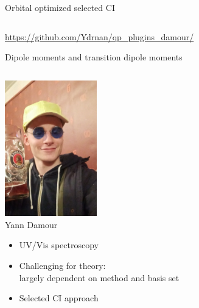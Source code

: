 \documentclass[aspectratio=169,9pt]{beamer}
\begin{document}
\begin{frame}{Orbital optimized selected CI}
\begin{columns}
        \end{columns}

                        \bigskip
                        \centering
	\url{https://github.com/Ydrnan/qp_plugins_damour/}

\end{frame}


\begin{frame}{Dipole moments and transition dipole moments}

\begin{columns}
\begin{column}{0.5\textwidth}

\centering
\includegraphics[width=0.3\textwidth]{fig/Yann.jpg}
\\
Yann Damour
\\
\begin{itemize}

	\item UV/Vis spectroscopy
                        \bigskip
	\item Challenging for theory: \\ largely dependent on method and basis set 
                        \bigskip
	\item Selected CI approach 
\end{itemize}
\end{column}


\end{columns}
\end{frame}
\end{document}
